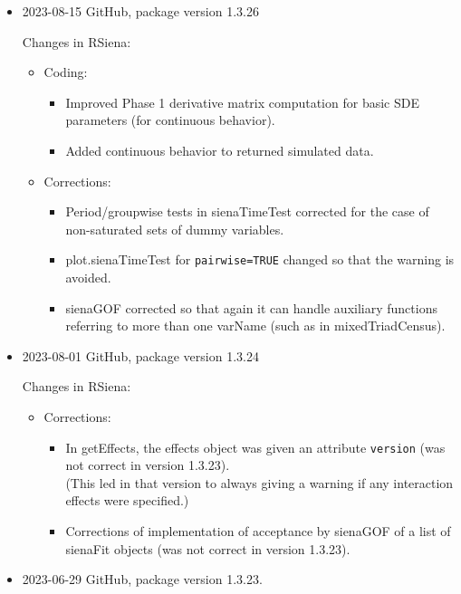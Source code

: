 \documentclass[a4paper,fleqn,11pt]{article}
\newcommand{\+}{\, + \,}
\newcommand{\sfn}[1]{\textsf{#1}}
\begin{document}
\begin{small}
\begin{itemize}
\item 2023-08-15 GitHub, package version 1.3.26

Changes in RSiena:
\begin{itemize}
\item Coding:
   \begin{itemize}
    \item Improved Phase 1 derivative matrix computation for basic SDE parameters
      (for continuous behavior).
    \item Added continuous behavior to returned simulated data.
    \end{itemize}
\item Corrections:
   \begin{itemize}
  \item Period/groupwise tests in \sfn{sienaTimeTest} corrected for the case of
    non-saturated sets of dummy variables.
  \item \sfn{plot.sienaTimeTest} for \texttt{pairwise=TRUE} changed so that the warning
    is avoided.
  \item \sfn{sienaGOF} corrected so that again it can handle auxiliary functions
    referring to more than one \sfn{varName} (such as in \sfn{mixedTriadCensus}).
    \end{itemize}
\end{itemize}


\item 2023-08-01 GitHub, package version 1.3.24

Changes in RSiena:
\begin{itemize}
\item Corrections:
   \begin{itemize}
   \item In \sfn{getEffects}, the effects object was given an attribute
     \texttt{version} (was not correct in version 1.3.23).\\
    (This led in that version to always giving a warning if any interaction
    effects were specified.)
  \item Corrections of implementation of acceptance by \sfn{sienaGOF} of a list of
    \sfn{sienaFit} objects (was not correct in version 1.3.23).
    \end{itemize}
\end{itemize}

\item 2023-06-29 GitHub, package version 1.3.23.



\end{itemize}
\end{small}
\end{document}
